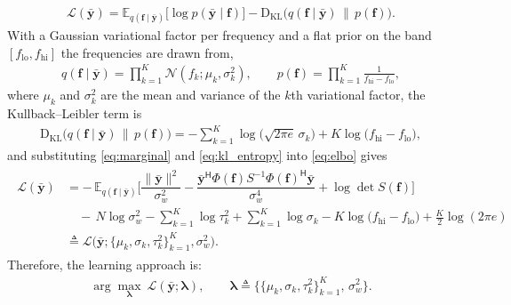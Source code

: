 \documentclass[journal,onecolumn]{IEEEtran}
\begin{document}
\begin{eqnarray}
\label{eq:elbo}
\mathcal{L}(\bar{\mathbf{y}})=\mathbb{E}_{q(\mathbf{f}\mid\bar{\mathbf{y}})}\!\big[\log p(\bar{\mathbf{y}}\mid\mathbf{f})\big]
-\mathrm{D}_{\mathrm{KL}}\big(q(\mathbf{f}\mid\bar{\mathbf{y}}) \,\big\|\, p(\mathbf{f})\big).
\end{eqnarray}
With a Gaussian variational factor per frequency and a flat prior on the band $[f_{\mathrm{lo}},f_{\mathrm{hi}}]$ the frequencies are drawn from,
\begin{eqnarray}
\label{eq:qf}
q(\mathbf{f}\mid\bar{\mathbf{y}})=\prod_{k=1}^{K}\mathcal{N}(f_k;\mu_k,\sigma_k^2),
\qquad
p(\mathbf{f})=\prod_{k=1}^{K}\frac{1}{f_{\mathrm{hi}}-f_{\mathrm{lo}}},
\end{eqnarray}
where $\mu_k$ and $\sigma_k^2$ are the mean and variance of the $k$th variational factor, the Kullback--Leibler term is
\begin{eqnarray}
\label{eq:kl_entropy}
\mathrm{D}_{\mathrm{KL}}\big(q(\mathbf{f}\mid\bar{\mathbf{y}}) \,\big\|\, p(\mathbf{f})\big)
=-\sum_{k=1}^{K}\log\big(\sqrt{2\pi e}\,\sigma_k\big)+K\log\big(f_{\mathrm{hi}}-f_{\mathrm{lo}}\big),
\end{eqnarray}
and substituting \eqref{eq:marginal} and \eqref{eq:kl_entropy} into \eqref{eq:elbo} gives
\begin{eqnarray}
\label{eq:elbo_explicit}
    \begin{array}{rl}
     \mathcal{L}(\bar{\mathbf{y}})
     & = -\,\mathbb{E}_{q(\mathbf{f}\mid\bar{\mathbf{y}})}\Big[
         \dfrac{\|\bar{\mathbf{y}}\|^2}{\sigma_w^2}
         -\dfrac{\bar{\mathbf{y}}^{\mathsf H}\Phi(\mathbf{f}) S^{-1}\Phi(\mathbf{f})^{\mathsf H}\bar{\mathbf{y}}}{\sigma_w^4}
         + \log\det S(\mathbf{f})\Big] \\[12pt]
     & \quad -\,N\log\sigma_w^2-\displaystyle\sum_{k=1}^{K}\log\tau_k^2
       + \displaystyle\sum_{k=1}^{K}\log\sigma_k
       - K\log\big(f_{\mathrm{hi}}-f_{\mathrm{lo}}\big) + \tfrac{K}{2}\log(2\pi e) \\[12pt]
     & \triangleq \mathcal{L}\big(\bar{\mathbf{y}};\{\mu_k,\sigma_k,\tau_k^2\}_{k=1}^{K},\sigma_w^2\big).
    \end{array}
\end{eqnarray}
Therefore, the learning approach is:
\begin{eqnarray}
\label{eq:argmax}
\arg\max_{\pmb{\lambda}}\ \mathcal{L}(\bar{\mathbf{y}};\pmb{\lambda}),
\qquad \pmb{\lambda}\triangleq\big\{\{\mu_k,\sigma_k,\tau_k^2\}_{k=1}^{K},\,\sigma_w^2\big\}.
\end{eqnarray}
\end{document}
